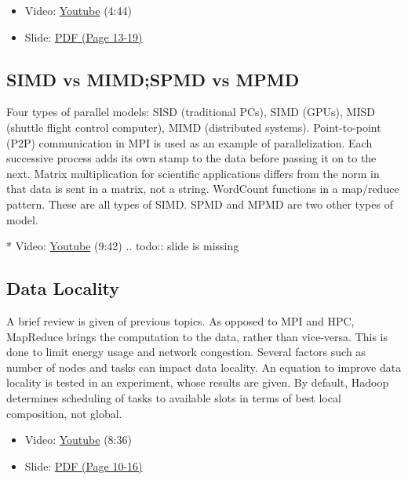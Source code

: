 \begin{itemize}
\tightlist
\item
  Video: \href{https://www.youtube.com/watch?v=isc0MjkwTlk}{Youtube}
  (4:44)
\item
  Slide:
  \href{https://drive.google.com/open?id=0B88HKpainTSfdnFvY1V3dlFTRlE}{PDF
  (Page 13-19)}
\end{itemize}

\subsection{SIMD vs MIMD;SPMD vs MPMD}\label{simd-vs-mimdspmd-vs-mpmd}

Four types of parallel models: SISD (traditional PCs), SIMD (GPUs), MISD
(shuttle flight control computer), MIMD (distributed systems).
Point-to-point (P2P) communication in MPI is used as an example of
parallelization. Each successive process adds its own stamp to the data
before passing it on to the next. Matrix multiplication for scientific
applications differs from the norm in that data is sent in a matrix, not
a string. WordCount functions in a map/reduce pattern. These are all
types of SIMD. SPMD and MPMD are two other types of model.

* Video: \href{https://www.youtube.com/watch?v=zHQiR56Zmtc}{Youtube}
(9:42) .. todo:: slide is missing

\subsection{Data Locality}\label{data-locality}

A brief review is given of previous topics. As opposed to MPI and HPC,
MapReduce brings the computation to the data, rather than vice-versa.
This is done to limit energy usage and network congestion. Several
factors such as number of nodes and tasks can impact data locality. An
equation to improve data locality is tested in an experiment, whose
results are given. By default, Hadoop determines scheduling of tasks to
available slots in terms of best local composition, not global.

\begin{itemize}
\tightlist
\item
  Video: \href{https://www.youtube.com/watch?v=RqLA7_asK50}{Youtube}
  (8:36)
\item
  Slide:
  \href{https://drive.google.com/open?id=0B88HKpainTSfT28zLTdKYWhGdGM}{PDF
  (Page 10-16)}
\end{itemize}

